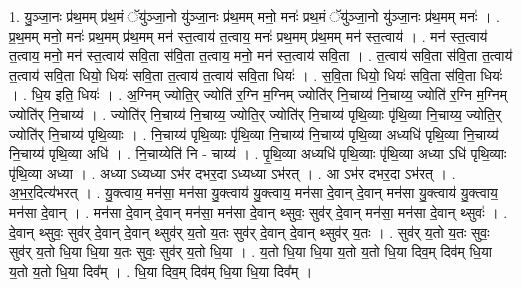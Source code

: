 \documentclass[17pt]{extarticle}
\begin{document}
1. यु॒ञ्जा॒नः प्र॑थ॒मम् प्र॑थ॒मं ॅयु॑ञ्जा॒नो यु॑ञ्जा॒नः प्र॑थ॒मम् मनो॒ मनः॑ प्रथ॒मं ॅयु॑ञ्जा॒नो यु॑ञ्जा॒नः प्र॑थ॒मम् मनः॑ । . प्र॒थ॒मम् मनो॒ मनः॑ प्रथ॒मम् प्र॑थ॒मम् मन॑ स्त॒त्वाय॑ त॒त्वाय॒ मनः॑ प्रथ॒मम् प्र॑थ॒मम् मन॑ स्त॒त्वाय॑ । . मन॑ स्त॒त्वाय॑ त॒त्वाय॒ मनो॒ मन॑ स्त॒त्वाय॑ सवि॒ता स॑वि॒ता त॒त्वाय॒ मनो॒ मन॑ स्त॒त्वाय॑ सवि॒ता । . त॒त्वाय॑ सवि॒ता स॑वि॒ता त॒त्वाय॑ त॒त्वाय॑ सवि॒ता धियो॒ धियः॑ सवि॒ता त॒त्वाय॑ त॒त्वाय॑ सवि॒ता धियः॑ । . स॒वि॒ता धियो॒ धियः॑ सवि॒ता स॑वि॒ता धियः॑ । . धि॒य इति॒ धियः॑ । . अ॒ग्निम् ज्योति॒र् ज्योति॑ र॒ग्नि म॒ग्निम् ज्योति॑र् नि॒चाय्य॑ नि॒चाय्य॒ ज्योति॑ र॒ग्नि म॒ग्निम् ज्योति॑र् नि॒चाय्य॑ । . ज्योति॑र् नि॒चाय्य॑ नि॒चाय्य॒ ज्योति॒र् ज्योति॑र् नि॒चाय्य॑ पृथि॒व्याः पृ॑थि॒व्या नि॒चाय्य॒ ज्योति॒र् ज्योति॑र् नि॒चाय्य॑ पृथि॒व्याः । . नि॒चाय्य॑ पृथि॒व्याः पृ॑थि॒व्या नि॒चाय्य॑ नि॒चाय्य॑ पृथि॒व्या अध्यधि॑ पृथि॒व्या नि॒चाय्य॑ नि॒चाय्य॑ पृथि॒व्या अधि॑ । . नि॒चाय्येति॑ नि - चाय्य॑ । . पृ॒थि॒व्या अध्यधि॑ पृथि॒व्याः पृ॑थि॒व्या अध्या ऽधि॑ पृथि॒व्याः पृ॑थि॒व्या अध्या । . अध्या ऽध्यध्या ऽभ॑र दभर॒दा ऽध्यध्या ऽभ॑रत् । . आ ऽभ॑र दभर॒दा ऽभ॑रत् । . अ॒भ॒र॒दित्य॑भरत् । . यु॒क्त्वाय॒ मन॑सा॒ मन॑सा यु॒क्त्वाय॑ यु॒क्त्वाय॒ मन॑सा दे॒वान् दे॒वान् मन॑सा यु॒क्त्वाय॑ यु॒क्त्वाय॒ मन॑सा दे॒वान् । . मन॑सा दे॒वान् दे॒वान् मन॑सा॒ मन॑सा दे॒वान् थ्सुवः॒ सुव॑र् दे॒वान् मन॑सा॒ मन॑सा दे॒वान् थ्सुवः॑ । . दे॒वान् थ्सुवः॒ सुव॑र् दे॒वान् दे॒वान् थ्सुव॑र् य॒तो य॒तः सुव॑र् दे॒वान् दे॒वान् थ्सुव॑र् य॒तः । . सुव॑र् य॒तो य॒तः सुवः॒ सुव॑र् य॒तो धि॒या धि॒या य॒तः सुवः॒ सुव॑र् य॒तो धि॒या । . य॒तो धि॒या धि॒या य॒तो य॒तो धि॒या दिव॒म् दिव॑म् धि॒या य॒तो य॒तो धि॒या दिव᳚म् । . धि॒या दिव॒म् दिव॑म् धि॒या धि॒या दिव᳚म् । \newline
\end{document}
